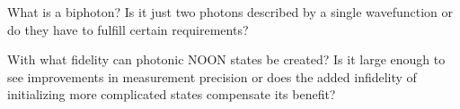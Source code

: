\documentclass{alex_summary}
\begin{document}
\begin{question1}
	What is a biphoton? Is it just two photons described by a single wavefunction or do they have to fulfill certain requirements?
\end{question1}

\begin{question3}
	With what fidelity can photonic NOON states be created? Is it large enough to see improvements in measurement precision or does the added infidelity of initializing more complicated states compensate its benefit?
\end{question3}

\printbibliography
\end{document}

